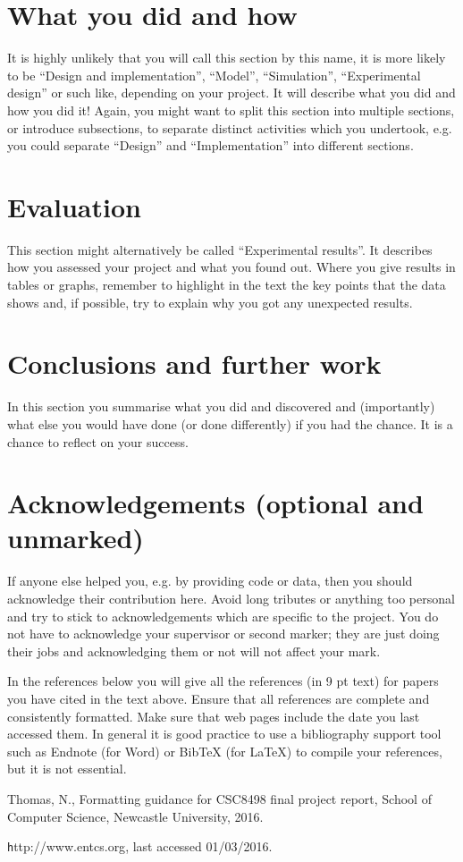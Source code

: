 \documentclass{entcs}
\begin{document}
\section{What you did and how}

It is highly unlikely that you will call this section by this name, it is more likely to be “Design and implementation”, “Model”, “Simulation”, “Experimental design” or such like, depending on your project. It will describe what you did and how you did it! Again, you might want to split this section into multiple sections, or introduce subsections, to separate distinct activities which you undertook, e.g. you could separate “Design” and “Implementation” into different sections. 

\section{Evaluation}

This section might alternatively be called “Experimental results”.  It describes how you assessed your project and what you found out. Where you give results in tables or graphs, remember to highlight in the text the key points that the data shows and, if possible, try to explain why you got any unexpected results.

\section{Conclusions and further work}

In this section you summarise what you did and discovered and (importantly) what else you would have done (or done differently) if you had the chance. It is a chance to reflect on your success.

\section{Acknowledgements (optional and unmarked)}

If anyone else helped you, e.g. by providing code or data, then you should acknowledge their contribution here. Avoid long tributes or anything too personal and try to stick to acknowledgements which are specific to the project. You do not have to acknowledge your supervisor or second marker; they are just doing their jobs and acknowledging them or not will not affect your mark. 

In the references below you will give all the references (in 9 pt text) for papers you have cited in the text above. Ensure that all references are complete and consistently formatted. Make sure that web pages include the date you last accessed them. In general it is good practice to use a bibliography support tool such as Endnote (for Word) or BibTeX (for LaTeX) to compile your references, but it is not essential. %

\begin{thebibliography}{25}


 Thomas, N., Formatting guidance for CSC8498 final project report, School of Computer Science, Newcastle University, 2016.

 {\texttt http://www.entcs.org}, last accessed 01/03/2016.


\end{thebibliography}
\end{document}
